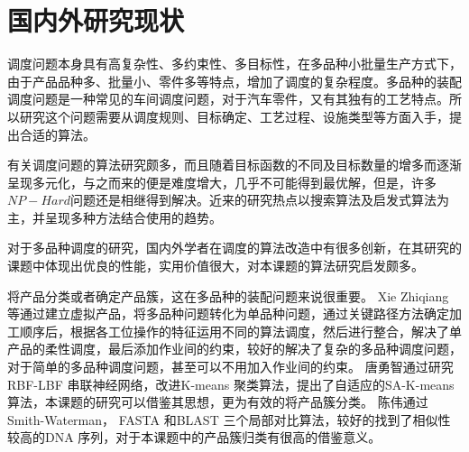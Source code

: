 \section{国内外研究现状}
调度问题本身具有高复杂性、多约束性、多目标性，在多品种小批量生产方式下，由于产品品种多、批量小、零件多等特点，增加了调度的复杂程度。多品种的装配调度问题是一种常见的车间调度问题，对于汽车零件，又有其独有的工艺特点。所以研究这个问题需要从调度规则、目标确定、工艺过程、设施类型等方面入手，提出合适的算法。

有关调度问题的算法研究颇多，而且随着目标函数的不同及目标数量的增多而逐渐呈现多元化，与之而来的便是难度增大，几乎不可能得到最优解，但是，许多$NP - Hard$问题还是相继得到解决。近来的研究热点以搜索算法及启发式算法为主，并呈现多种方法结合使用的趋势。

对于多品种调度的研究，国内外学者在调度的算法改造中有很多创新，在其研究的课题中体现出优良的性能，实用价值很大，对本课题的算法研究启发颇多。

将产品分类或者确定产品簇，这在多品种的装配问题来说很重要。
Xie Zhiqiang\cite{xie2010study} 等通过建立虚拟产品，将多品种问题转化为单品种问题，通过关键路径方法确定加工顺序后，根据各工位操作的特征运用不同的算法调度，然后进行整合，解决了单产品的柔性调度，最后添加作业间的约束，较好的解决了复杂的多品种调度问题，对于简单的多品种调度问题，甚至可以不用加入作业间的约束。
唐勇智\cite{唐勇智2009基于聚类的}通过研究RBF-LBF 串联神经网络，改进K-means 聚类算法，提出了自适应的SA-K-means 算法，本课题的研究可以借鉴其思想，更为有效的将产品簇分类。
陈伟\cite{陈伟2006生物信息学中的序列相似性比对算法}通过Smith-Waterman， FASTA 和BLAST 三个局部对比算法，较好的找到了相似性较高的DNA 序列，对于本课题中的产品簇归类有很高的借鉴意义。

